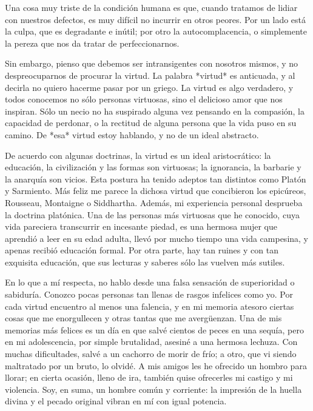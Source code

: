 \documentclass[a4paper, 12pt]{article}
\begin{document}
Una cosa muy triste de la condición humana es que, cuando tratamos de lidiar
con nuestros defectos, es muy difícil no incurrir en otros peores. Por un lado
está la culpa, que es degradante e inútil; por otro la autocomplacencia, o
simplemente la pereza que nos da tratar de perfeccionarnos. 

Sin embargo, pienso que debemos ser intransigentes con nosotros mismos, y no
despreocuparnos de procurar la virtud. La palabra *virtud* es anticuada, y al
decirla no quiero hacerme pasar por un griego. La virtud es algo verdadero, y
todos conocemos no sólo personas virtuosas, sino el delicioso amor que nos
inspiran. Sólo un necio no ha suspirado alguna vez pensando en la compasión, la
capacidad de perdonar, o la rectitud de alguna persona que la vida puso en su
camino. De *esa* virtud estoy hablando, y no de un ideal abstracto.

De acuerdo con algunas doctrinas, la virtud es un ideal aristocrático: la
educación, la civilización y las formas son virtuosas; la ignorancia, la
barbarie y la anarquía son vicios. Esta postura ha tenido adeptos tan distintos
como Platón y Sarmiento. Más feliz me parece la dichosa virtud que concibieron
los epicúreos, Rousseau, Montaigne o Siddhartha. Además, mi experiencia personal
desprueba la doctrina platónica. Una de las personas más virtuosas que he
conocido, cuya vida pareciera transcurrir en incesante piedad, es una hermosa
mujer que aprendió a leer en su edad adulta, llevó por mucho tiempo una vida
campesina, y apenas recibió educación formal. Por otra parte, hay tan ruines y
con tan exquisita educación, que sus lecturas y saberes sólo las vuelven más
sutiles.

En lo que a mí respecta, no hablo desde una falsa sensación de superioridad o
sabiduría. Conozco pocas personas tan llenas de rasgos infelices como yo. Por
cada virtud encuentro al menos una falencia, y en mi memoria atesoro ciertas
cosas que me enorgullecen y otras tantas que me avergüenzan. Una de mis memorias
más felices es un día en que salvé cientos de peces en una sequía, pero en mi
adolescencia, por simple brutalidad, asesiné a una hermosa lechuza. Con muchas
dificultades, salvé a un cachorro de morir de frío; a otro, que vi siendo
maltratado por un bruto, lo olvidé. A mis amigos les he ofrecido un hombro para
llorar; en cierta ocasión, lleno de ira, también quise ofrecerles mi castigo y
mi violencia. Soy, en suma, un hombre común y corriente: la impresión de la
huella divina y el pecado original vibran en mí con igual potencia. 
\end{document}
